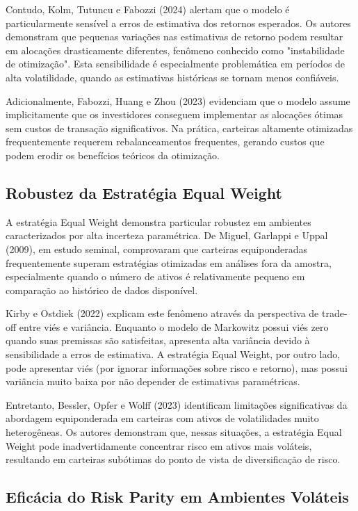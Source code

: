 Contudo, Kolm, Tutuncu e Fabozzi (2024) alertam que o modelo é particularmente sensível a erros de estimativa dos retornos esperados. Os autores demonstram que pequenas variações nas estimativas de retorno podem resultar em alocações drasticamente diferentes, fenômeno conhecido como "instabilidade de otimização". Esta sensibilidade é especialmente problemática em períodos de alta volatilidade, quando as estimativas históricas se tornam menos confiáveis.

Adicionalmente, Fabozzi, Huang e Zhou (2023) evidenciam que o modelo assume implicitamente que os investidores conseguem implementar as alocações ótimas sem custos de transação significativos. Na prática, carteiras altamente otimizadas frequentemente requerem rebalanceamentos frequentes, gerando custos que podem erodir os benefícios teóricos da otimização.

\subsection{Robustez da Estratégia Equal Weight}

A estratégia Equal Weight demonstra particular robustez em ambientes caracterizados por alta incerteza paramétrica. De Miguel, Garlappi e Uppal (2009), em estudo seminal, comprovaram que carteiras equiponderadas frequentemente superam estratégias otimizadas em análises fora da amostra, especialmente quando o número de ativos é relativamente pequeno em comparação ao histórico de dados disponível.

Kirby e Ostdiek (2022) explicam este fenômeno através da perspectiva de trade-off entre viés e variância. Enquanto o modelo de Markowitz possui viés zero quando suas premissas são satisfeitas, apresenta alta variância devido à sensibilidade a erros de estimativa. A estratégia Equal Weight, por outro lado, pode apresentar viés (por ignorar informações sobre risco e retorno), mas possui variância muito baixa por não depender de estimativas paramétricas.

Entretanto, Bessler, Opfer e Wolff (2023) identificam limitações significativas da abordagem equiponderada em carteiras com ativos de volatilidades muito heterogêneas. Os autores demonstram que, nessas situações, a estratégia Equal Weight pode inadvertidamente concentrar risco em ativos mais voláteis, resultando em carteiras subótimas do ponto de vista de diversificação de risco.

\subsection{Eficácia do Risk Parity em Ambientes Voláteis}

